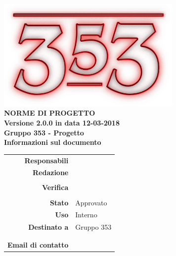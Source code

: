 \documentclass[openany, a4paper, 12pt]{report}
\begin{document}
\begin{titlepage}
	\centering
	\vfill
	{
		\bfseries
		\vskip2cm
		\includegraphics[width=9cm]{../../common/images/logo.png} \\
		\vfill
		\Huge{NORME DI PROGETTO}\\
		\vfill
		\Large Versione 2.0.0 in data 12-03-2018\\ 
		\large Gruppo 353 - Progetto \progetto \\
		\vfill
		\normalsize Informazioni sul documento\\
		\begin{table}[htbp]
			\centering
			\renewcommand\arraystretch{1.2}
			\begin{tabular}{r|l}
				\hline
				\textbf{Responsabili}	& \Riccardo \\
								
														
				\textbf{Redazione} 		& \Gianluca \\
										& \Valentina \\
										
				\textbf{Verifica} 		& \Davide \\
										& \Mirco \\	
				
				\textbf{Stato} 			& Approvato \\
				\textbf{Uso}			& Interno \\
				\textbf{Destinato a}   	& Gruppo 353 \\
										& \Vardanega \\
										& \Cardin \\
				
				\textbf{Email di contatto}	& \mailgroup
			\end{tabular}
		\end{table}
		\vfill
	}    
\end{titlepage}

\tableofcontents
\newpage
{}




\appendix



 
\end{document}
